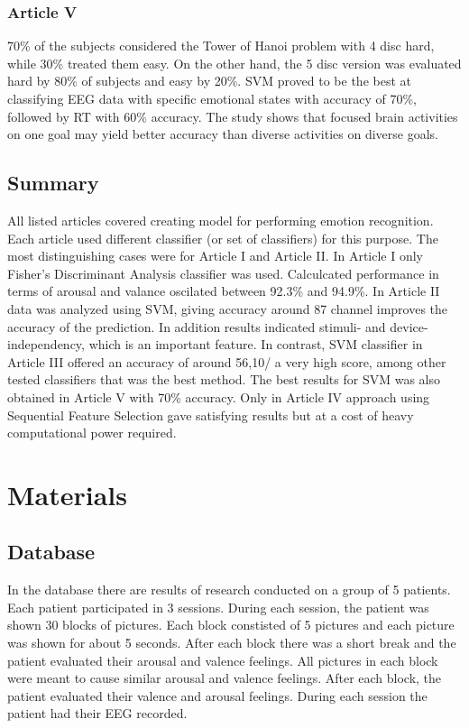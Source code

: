\documentclass[10pt,journal,compsoc]{IEEEtran}
\begin{document}
\subsubsection*{Article V}
70\% of the subjects considered the Tower of Hanoi problem with 4 disc hard, while 30\% treated them easy. On the other hand, the 5 disc version was evaluated hard by 80\% of subjects and easy by 20\%. SVM proved to be the best at classifying EEG data with specific emotional states with accuracy of 70\%, followed by RT with 60\% accuracy. The study shows that focused brain activities on one goal may yield better accuracy than diverse activities on diverse goals.

\subsection{Summary}
All listed articles covered creating model for performing emotion recognition.
Each article used different classifier (or set of classifiers) for this purpose.
The most distinguishing cases were for Article I and Article II. In Article I only
Fisher's Discriminant Analysis classifier was used. Calculcated performance in terms
of arousal and valance oscilated between 92.3\% and 94.9\%. In Article II data was
analyzed using SVM, giving accuracy around 87%
channel improves the accuracy of the prediction. In addition results indicated
stimuli- and device-independency, which is an important feature. In contrast, SVM
classifier in Article III offered an accuracy of around 56,10/%
a very high score, among other tested classifiers that was the best method. The best
results for SVM was also obtained in Article V with 70\% accuracy. Only in Article IV
approach using Sequential Feature Selection gave satisfying results but at a cost of
heavy computational power required. 

\section{Materials}

\subsection{Database}
In the database there are results of research conducted on a group of 5 patients. Each patient participated in 3 sessions. During each session, the patient was shown 30 blocks of pictures. Each block constisted of 5 pictures and each picture was shown for about 5 seconds. After each block there was a short break and the patient evaluated their arousal and valence feelings. All pictures in each block were meant to cause similar arousal and valence feelings. After each block, the patient evaluated their valence and arousal feelings. During each session the patient had their EEG recorded.
\end{document}
